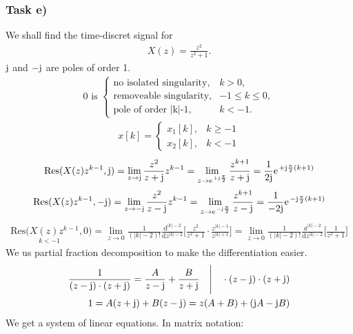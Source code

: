 \subsubsection{Task e)}
We shall find the time-discret signal for 
\begin{align}
	X(z)=\frac{z^2}{z^2+1}.
\end{align}
$\im$ and $-\im$ are poles of order 1.
\begin{align}
	0 \text{ is }\begin{cases}
		\text{no isolated singularity}, &k> 0,\\
		\text{removeable singularity}, &-1\leq k \leq 0,\\
		\text{pole of order |k|-1}, &k<-1.
	\end{cases}
\end{align}
\begin{align}
	x[k]=\begin{cases}
		x_1[k], &k\geq -1 \\
		x_2[k], &k< -1
	\end{cases}
\end{align}
\begin{align}
	\mathrm{Res}(X(z)z^{k-1},\im)=\lim\limits_{z\rightarrow\im}\frac{z^2}{z+\im}z^{k-1}=\lim\limits_{z\rightarrow\e^{+\im\frac{\pi}{2}}}\frac{z^{k+1}}{z+\im}=\frac{1}{2\im}\e^{+\im\frac{\pi}{2}(k+1)}
\end{align}
\begin{align}
	\mathrm{Res}(X(z)z^{k-1},-\im)=\lim\limits_{z\rightarrow-\im}\frac{z^2}{z-\im}z^{k-1}=\lim\limits_{z\rightarrow\e^{-\im\frac{\pi}{2}}}\frac{z^{k+1}}{z-\im}=\frac{1}{-2\im}\e^{-\im\frac{\pi}{2}(k+1)}
\end{align}
\begin{align}
	\underset{k<-1}{\mathrm{Res}(X(z)z^{k-1},0})=\lim\limits_{z\rightarrow0}\frac{1}{(|k|-2)!}\frac{\mathrm{d}^{|k|-2}}{\mathrm{d}z^{|k|-2}}\Bigg [\frac{z^2}{z^2+1} \cdot\frac{z^{|k|-1}}{z^{|k|+1}}\Bigg]=\lim\limits_{z\rightarrow0}\frac{1}{(|k|-2)!}\frac{\mathbb{d}^{|k|-2}}{\mathrm{d}z^{|k|-2}}\Bigg [\frac{1}{z^2+1}\Bigg]
\end{align}
We us partial fraction decomposition to make the differentiation easier.
\begin{align}
	\frac{1}{(z-\im)\cdot(z+\im)}=\frac{A}{z-\im}+\frac{B}{z+\im}\quad\Bigg | \quad \cdot(z-\im)\cdot(z+\im) \nonumber \\
	1=A(z+\im)+B(z-\im)=z(A+B)+(\im A -\im B)
\end{align}
We get a system of linear equations. In matrix notation:
